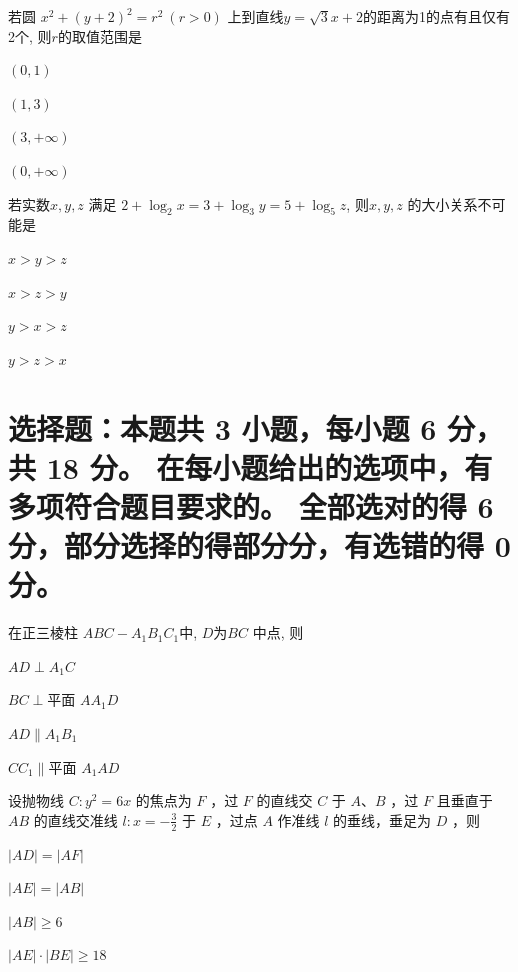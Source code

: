 \documentclass{exam-zh}
\begin{document}
\begin{question}
  若圆 $x^2 + (y+2)^2 = r^2~(r > 0)$ 上到直线$y= \sqrt{3}x+2$的距离为1的点有且仅有2个, 则$r$的取值范围是 \paren
  \begin{choices}
    \item $(0,1)$
    \item $(1,3)$
    \item $(3,+\infty)$
    \item $(0,+\infty)$
  \end{choices}
\end{question}

\begin{question}
  若实数$x,y,z$ 满足 $2+ \log_2 x = 3 + \log_3 y = 5 + \log_5 z$, 则$x,y,z$ 的大小关系不可能是 \paren
  \begin{choices}
    \item $x > y>z$
    \item $x > z >y$
    \item $y > x>z$
    \item $y > z>x$
  \end{choices}
\end{question}


\section{
  选择题：本题共 3 小题，每小题 6 分，共 18 分。
  在每小题给出的选项中，有多项符合题目要求的。
  全部选对的得 6 分，部分选择的得部分分，有选错的得 0 分。
}
\begin{question}
  在正三棱柱 $ABC-A_1B_1C_1$中, $D$为$BC$ 中点, 则 \paren
  \begin{choices}[columns = 2]
    \item $AD \perp A_1C$
    \item $BC \perp \text{平面 } AA_1D$
    \item $AD \parallel A_1B_1$ 
    \item $CC_1 \parallel \text{平面 } A_1AD$
  \end{choices}
\end{question}

\begin{question}
  设抛物线 $C: y^2=6 x$ 的焦点为 $F$ ，过 $F$ 的直线交 $C$ 于 $A$、$B$ ，过 $F$ 且垂直于 $A B$ 的直线交准线 $l: x=-\frac{3}{2}$ 于 $E$ ，过点 $A$ 作准线 $l$ 的垂线，垂足为 $D$ ，则 \paren
  \begin{choices}
    \item $|AD| = |AF|$
    \item $|AE| = |AB|$
    \item $|AB| \ge 6$
    \item $|AE| \cdot |BE| \ge 18$
  \end{choices}
\end{question}
\end{document}
